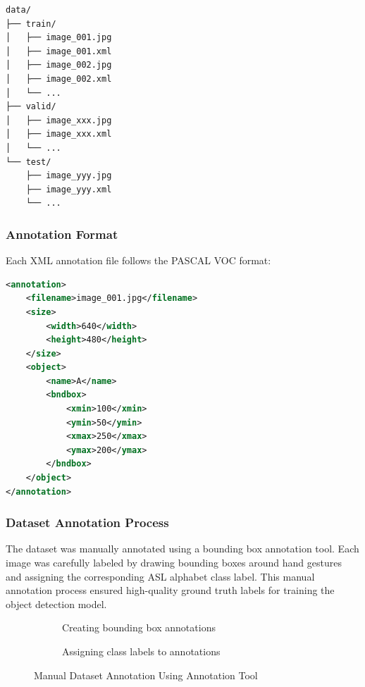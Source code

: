 \documentclass[12pt,a4paper]{article}
\begin{document}
\begin{lstlisting}[language=bash, caption=Dataset Directory Structure]
data/
├── train/
│   ├── image_001.jpg
│   ├── image_001.xml
│   ├── image_002.jpg
│   ├── image_002.xml
│   └── ...
├── valid/
│   ├── image_xxx.jpg
│   ├── image_xxx.xml
│   └── ...
└── test/
    ├── image_yyy.jpg
    ├── image_yyy.xml
    └── ...
\end{lstlisting}

\subsubsection{Annotation Format}

Each XML annotation file follows the PASCAL VOC format:

\begin{lstlisting}[language=xml, caption=PASCAL VOC Annotation Format]
<annotation>
    <filename>image_001.jpg</filename>
    <size>
        <width>640</width>
        <height>480</height>
    </size>
    <object>
        <name>A</name>
        <bndbox>
            <xmin>100</xmin>
            <ymin>50</ymin>
            <xmax>250</xmax>
            <ymax>200</ymax>
        </bndbox>
    </object>
</annotation>
\end{lstlisting}

\subsubsection{Dataset Annotation Process}

The dataset was manually annotated using a bounding box annotation tool. Each image was carefully labeled by drawing bounding boxes around hand gestures and assigning the corresponding ASL alphabet class label. This manual annotation process ensured high-quality ground truth labels for training the object detection model.

\begin{figure}[H]
    \centering
    \begin{subfigure}[b]{0.48\textwidth}
        \centering
        \caption{Creating bounding box annotations}
        \label{fig:annotation_tool_1}
    \end{subfigure}
    \hfill
    \begin{subfigure}[b]{0.48\textwidth}
        \centering
        \caption{Assigning class labels to annotations}
        \label{fig:annotation_tool_2}
    \end{subfigure}
    \caption{Manual Dataset Annotation Using Annotation Tool}
    \label{fig:annotation_screenshots}
\end{figure}
\end{document}
